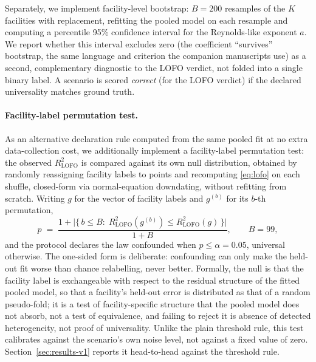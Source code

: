 \documentclass[journal=dce]{CUP-JNL-DTM}%
\begin{document}
Separately, we implement facility-level bootstrap: $B=200$ resamples of the $K$ facilities with replacement, refitting the pooled model on each resample and computing a percentile 95\% confidence interval for the Reynolds-like exponent $a$. We report whether this interval excludes zero (the coefficient ``survives'' bootstrap, the same language and criterion the companion manuscripts use) as a second, complementary diagnostic to the LOFO verdict, not folded into a single binary label. A scenario is scored \emph{correct} (for the LOFO verdict) if the declared universality matches ground truth.

\paragraph{Facility-label permutation test.} As an alternative declaration rule computed from the same pooled fit at no extra data-collection cost, we additionally implement a facility-label permutation test: the observed $R^{2}_{\mathrm{LOFO}}$ is compared against its own null distribution, obtained by randomly reassigning facility labels to points and recomputing \eqref{eq:lofo} on each shuffle, closed-form via normal-equation downdating, without refitting from scratch. Writing $g$ for the vector of facility labels and $g^{(b)}$ for its $b$-th permutation,
\begin{equation}
p \;=\; \frac{1+\bigl|\{\,b\le B:\;R^{2}_{\mathrm{LOFO}}(g^{(b)})\le R^{2}_{\mathrm{LOFO}}(g)\,\}\bigr|}{1+B},
\qquad B=99,
\label{eq:perm}
\end{equation}
and the protocol declares the law confounded when $p\le\alpha=0.05$, universal otherwise. The one-sided form is deliberate: confounding can only make the held-out fit worse than chance relabelling, never better. Formally, the null is that the facility label is exchangeable with respect to the residual structure of the fitted pooled model, so that a facility's held-out error is distributed as that of a random pseudo-fold; it is a test of facility-specific structure that the pooled model does not absorb, not a test of equivalence, and failing to reject it is absence of detected heterogeneity, not proof of universality. Unlike the plain threshold rule, this test calibrates against the scenario's own noise level, not against a fixed value of zero. Section~\ref{sec:results-v1} reports it head-to-head against the threshold rule.
\end{document}
